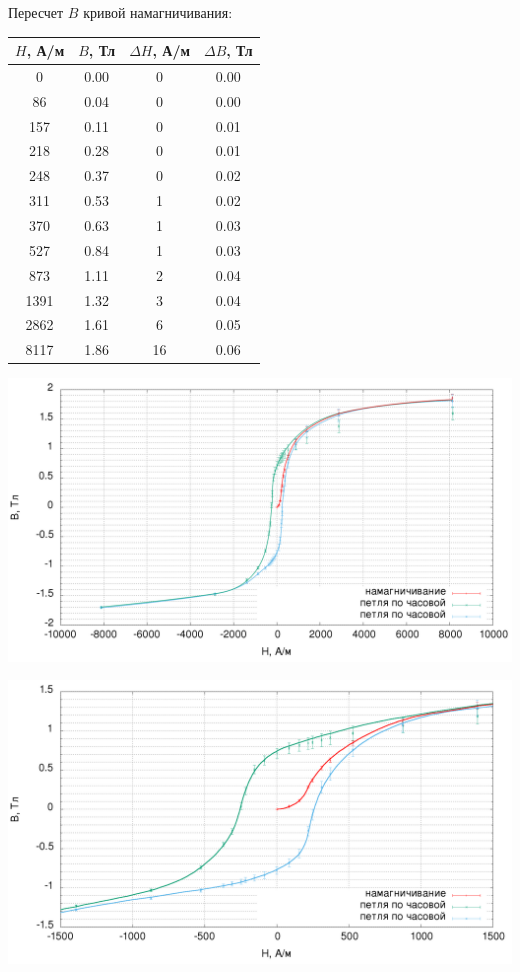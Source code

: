 \documentclass[a4paper]{article}
\begin{document}
\begin{enumerate}
Пересчет $B$ кривой намагничивания:
\begin{table}[h]
\centering
\begin{tabular}{|c|c|c|c|}
\hline
$H$, А/м & $B$, Тл & $\Delta H$, А/м & $\Delta B$, Тл \\ \hline
0      & 0.00  & 0    & 0.00 \\ \hline
86     & 0.04  & 0    & 0.00 \\ \hline
157    & 0.11  & 0    & 0.01 \\ \hline
218    & 0.28  & 0    & 0.01 \\ \hline
248    & 0.37  & 0    & 0.02 \\ \hline
311    & 0.53  & 1    & 0.02 \\ \hline
370    & 0.63  & 1    & 0.03 \\ \hline
527    & 0.84  & 1    & 0.03 \\ \hline
873    & 1.11  & 2    & 0.04 \\ \hline
1391   & 1.32  & 3    & 0.04 \\ \hline
2862   & 1.61  & 6    & 0.05 \\ \hline
8117   & 1.86  & 16   & 0.06 \\ \hline
\end{tabular}
\end{table}

\begin{center}
\includegraphics[width=\textwidth]{5_big.png}
\end{center}
\begin{center}
\includegraphics[width=\textwidth]{5_small.png}
\end{center}


\end{enumerate}
\end{document}
